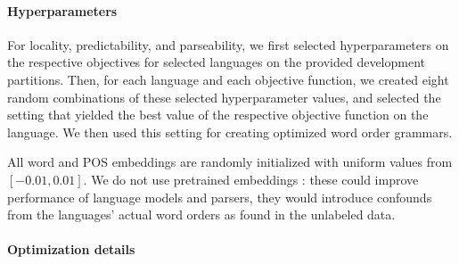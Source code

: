 \documentclass[12pt]{article}
\begin{document}
\paragraph{Hyperparameters}
For locality, predictability, and parseability, we first selected hyperparameters on the respective objectives for selected languages on the provided development partitions.
Then, for each language and each objective function, we created eight random combinations of these selected hyperparameter values, and selected the setting that yielded the best value of the respective objective function on the language. We then used this setting for creating optimized word order grammars. %


All word and POS embeddings are randomly initialized with uniform values from $[-0.01, 0.01]$.
We do not use pretrained embeddings \citep{peters2018deep}: these could improve performance of language models and parsers, they would introduce confounds from the languages' actual word orders as found in the unlabeled data.


%    

\paragraph{Optimization details}
\end{document}
